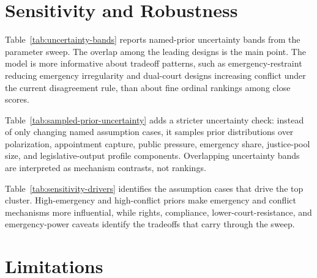 \documentclass[
    journal=jlc,
    manuscript=research-article,
    year=2026,
  ]{cup-journal}
\begin{document}
\section{Sensitivity and Robustness}

Table~\ref{tab:uncertainty-bands} reports named-prior uncertainty bands from the parameter sweep. The overlap among the leading designs is the main point. The model is more informative about tradeoff patterns, such as emergency-restraint reducing emergency irregularity and dual-court designs increasing conflict under the current disagreement rule, than about fine ordinal rankings among close scores.





Table~\ref{tab:sampled-prior-uncertainty} adds a stricter uncertainty check: instead of only changing named assumption cases, it samples prior distributions over polarization, appointment capture, public pressure, emergency share, justice-pool size, and legislative-output profile components. Overlapping uncertainty bands are interpreted as mechanism contrasts, not rankings.



Table~\ref{tab:sensitivity-drivers} identifies the assumption cases that drive the top cluster. High-emergency and high-conflict priors make emergency and conflict mechanisms more influential, while rights, compliance, lower-court-resistance, and emergency-power caveats identify the tradeoffs that carry through the sweep.

\section{Limitations}
\end{document}
